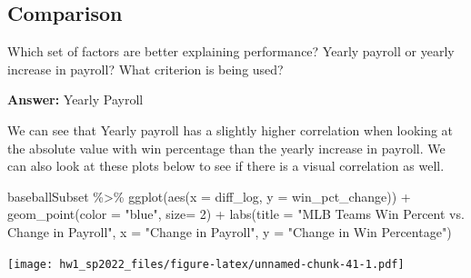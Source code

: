 \documentclass[
]{article}
\newenvironment{Shaded}{\begin{snugshade}}{\end{snugshade}}
\newcommand{\AttributeTok}[1]{\textcolor[rgb]{0.77,0.63,0.00}{#1}}
\newcommand{\DecValTok}[1]{\textcolor[rgb]{0.00,0.00,0.81}{#1}}
\newcommand{\FunctionTok}[1]{\textcolor[rgb]{0.00,0.00,0.00}{#1}}
\newcommand{\NormalTok}[1]{#1}
\newcommand{\SpecialCharTok}[1]{\textcolor[rgb]{0.00,0.00,0.00}{#1}}
\newcommand{\StringTok}[1]{\textcolor[rgb]{0.31,0.60,0.02}{#1}}
\begin{document}
\hypertarget{comparison}{%
\subsection{Comparison}\label{comparison}}

Which set of factors are better explaining performance? Yearly payroll
or yearly increase in payroll? What criterion is being used?

\textbf{Answer:} Yearly Payroll

\begin{Shaded}
\end{Shaded}

We can see that Yearly payroll has a slightly higher correlation when
looking at the absolute value with win percentage than the yearly
increase in payroll. We can also look at these plots below to see if
there is a visual correlation as well.

\begin{Shaded}
\begin{Highlighting}[]
\NormalTok{baseballSubset }\SpecialCharTok{\%\textgreater{}\%}
  \FunctionTok{ggplot}\NormalTok{(}\FunctionTok{aes}\NormalTok{(}\AttributeTok{x =}\NormalTok{ diff\_log, }\AttributeTok{y =}\NormalTok{ win\_pct\_change)) }\SpecialCharTok{+} 
  \FunctionTok{geom\_point}\NormalTok{(}\AttributeTok{color =} \StringTok{"blue"}\NormalTok{, }\AttributeTok{size=} \DecValTok{2}\NormalTok{) }\SpecialCharTok{+} 
  \FunctionTok{labs}\NormalTok{(}\AttributeTok{title =} \StringTok{"MLB Team\textquotesingle{}s Win Percent  vs. Change in Payroll"}\NormalTok{, }
       \AttributeTok{x =} \StringTok{"Change in Payroll"}\NormalTok{, }
       \AttributeTok{y =} \StringTok{"Change in Win Percentage"}\NormalTok{)}
\end{Highlighting}
\end{Shaded}

\texttt{[image: hw1\_sp2022\_files/figure-latex/unnamed-chunk-41-1.pdf]}
\end{document}
